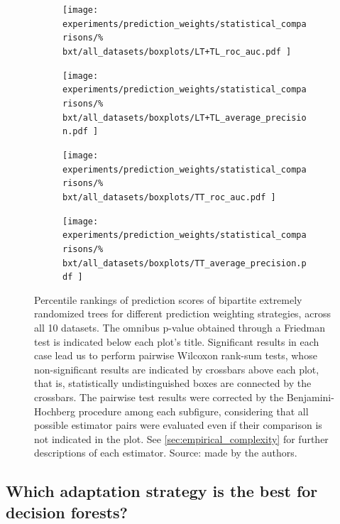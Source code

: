 \begin{figure}[tbh]
    \centering
    \begin{subfigure}{0.49\textwidth}
        \texttt{[image: 
            experiments/prediction\_weights/statistical\_comparisons/\%
            bxt/all\_datasets/boxplots/LT+TL\_roc\_auc.pdf
        ]}
    \end{subfigure}
    \begin{subfigure}{0.49\textwidth}
        \texttt{[image: 
            experiments/prediction\_weights/statistical\_comparisons/\%
            bxt/all\_datasets/boxplots/LT+TL\_average\_precision.pdf
        ]}
    \end{subfigure}

    \begin{subfigure}{0.49\textwidth}
        \texttt{[image: 
            experiments/prediction\_weights/statistical\_comparisons/\%
            bxt/all\_datasets/boxplots/TT\_roc\_auc.pdf
        ]}
    \end{subfigure}
    \begin{subfigure}{0.49\textwidth}
        \texttt{[image: 
            experiments/prediction\_weights/statistical\_comparisons/\%
            bxt/all\_datasets/boxplots/TT\_average\_precision.pdf
        ]}
    \end{subfigure}
    \caption{
        Percentile rankings of prediction scores of bipartite extremely randomized trees for different prediction weighting strategies, across all 10 datasets.
        The omnibus p-value obtained through a Friedman test is indicated below each plot's title. Significant results in each case lead us to perform pairwise Wilcoxon rank-sum tests, whose non-significant results are indicated by crossbars above each plot, that is, statistically undistinguished boxes are connected by the crossbars. The pairwise test results were corrected by the Benjamini-Hochberg procedure among each subfigure, considering that all possible estimator pairs were evaluated even if their comparison is not indicated in the plot. See \autoref{sec:empirical_complexity} for further descriptions of each estimator. Source: made by the authors.
    }
    \label{fig:pred_weights_bxt}
\end{figure}



\subsection{Which adaptation strategy is the best for decision forests?}
\label{sec:adaptation_comparison}


